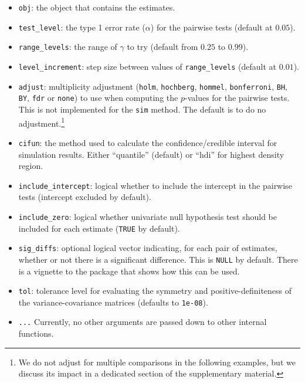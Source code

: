 \begin{itemize}
\tightlist
\item
  \texttt{obj}: the object that contains the estimates.
\item
  \texttt{test\_level}: the type 1 error rate (\(\alpha\)) for the pairwise tests (default at \(0.05\)).
\item
  \texttt{range\_levels}: the range of \(\gamma\) to try (default from \(0.25\) to \(0.99\)).
\item
  \texttt{level\_increment}: step size between values of \texttt{range\_levels} (default at \(0.01\)).
\item
  \texttt{adjust}: multiplicity adjustment (\texttt{holm}, \texttt{hochberg}, \texttt{hommel}, \texttt{bonferroni}, \texttt{BH}, \texttt{BY}, \texttt{fdr} or \texttt{none}) to use when computing the \(p\)-values for the pairwise tests. This is not implemented for the \texttt{sim} method. The default is to do no adjustment.\footnote{We do not adjust for multiple comparisons in the following examples, but we discuss its impact in a dedicated section of the supplementary material.}\\
\item
  \texttt{cifun}: the method used to calculate the confidence/credible interval for simulation results. Either ``quantile'' (default) or ``hdi'' for highest density region.
\item
  \texttt{include\_intercept}: logical whether to include the intercept in the pairwise tests (intercept excluded by default).
\item
  \texttt{include\_zero}: logical whether univariate null hypothesis test should be included for each estimate (\texttt{TRUE} by default).
\item
  \texttt{sig\_diffs}: optional logical vector indicating, for each pair of estimates, whether or not there is a significant difference. This is \texttt{NULL} by default. There is a vignette to the package that shows how this can be used.
\item
  \texttt{tol}: tolerance level for evaluating the symmetry and positive-definiteness of the variance-covariance matrices (defaults to \texttt{1e-08}).
\item
  \texttt{...} Currently, no other arguments are passed down to other internal functions.
\end{itemize}


